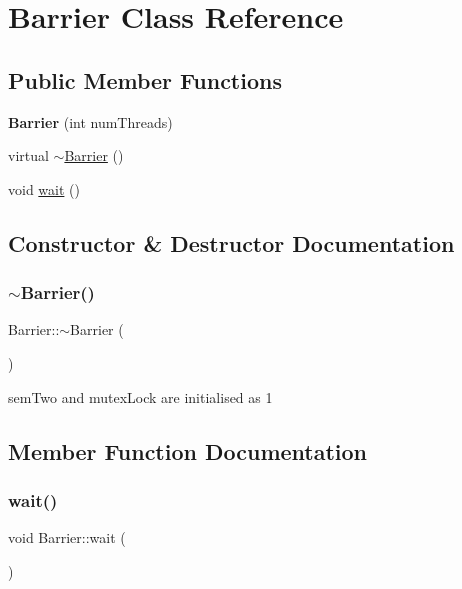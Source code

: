 \hypertarget{classBarrier}{}\section{Barrier Class Reference}
\label{classBarrier}
\subsection*{Public Member Functions}
\begin{DoxyCompactItemize}
\item 
\mbox{\label{classBarrier_a7290fb8952d0f7779b8d6a7a34bbd407}} 
{\bfseries Barrier} (int num\+Threads)
\item 
virtual \hyperlink{classBarrier_a401f40e73302009b305904ffc7825304}{$\sim$\+Barrier} ()
\item 
void \hyperlink{classBarrier_a83a9d2e85e98b3d2081538bf0da29b60}{wait} ()
\end{DoxyCompactItemize}


\subsection{Constructor \& Destructor Documentation}
\mbox{\label{classBarrier_a401f40e73302009b305904ffc7825304}} 
\subsubsection{\texorpdfstring{$\sim$\+Barrier()}{~Barrier()}}
{\footnotesize\ttfamily Barrier\+::$\sim$\+Barrier (\begin{DoxyParamCaption}{ }\end{DoxyParamCaption})\hspace{0.3cm}{\ttfamily [virtual]}}

sem\+Two and mutex\+Lock are initialised as 1 

\subsection{Member Function Documentation}
\mbox{\label{classBarrier_a83a9d2e85e98b3d2081538bf0da29b60}} 
\subsubsection{\texorpdfstring{wait()}{wait()}}
{\footnotesize\ttfamily void Barrier\+::wait (\begin{DoxyParamCaption}{ }\end{DoxyParamCaption})}

